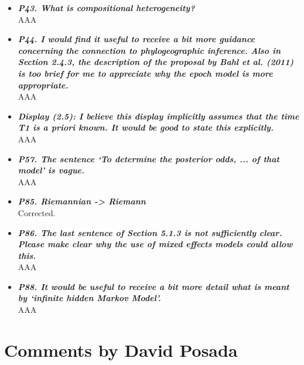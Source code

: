 \documentclass[english]{article}
\begin{document}
\begin{itemize}
\item {
{\it
\textbf{
P43. What is compositional heterogeneity?
}%
}%
}%
\\
AAA



\item {
{\it
\textbf{
P44. I would find it useful to receive a bit more guidance concerning the connection to phylogeographic inference. 
Also in Section 2.4.3, the description of the proposal by Bahl et al. (2011) is too brief for me to appreciate why the epoch model is more appropriate.
}%
}%
}%
\\
AAA


\item {
{\it
\textbf{
Display (2.5): I believe this display implicitly assumes that the time T1 is a priori known. 
It would be good to state this explicitly.
}%
}%
}%
\\
AAA


\item {
{\it
\textbf{
P57. The sentence `To determine the posterior odds, ... of that model' is vague.
}%
}%
}%
\\
AAA


\item {
{\it
\textbf{
P85. Riemannian -> Riemann
}%
}%
}%
\\
Corrected.


\item {
{\it
\textbf{
P86. The last sentence of Section 5.1.3 is not sufficiently clear. 
Please make clear why the use of mixed effects models could allow this.
}%
}%
}%
\\
AAA


\item {
{\it
\textbf{
P88. It would be useful to receive a bit more detail what is meant by `infinite hidden Markov Model'.
}%
}%
}%
\\
AAA



\end{itemize}


\section*{Comments by David Posada}
\end{document}
